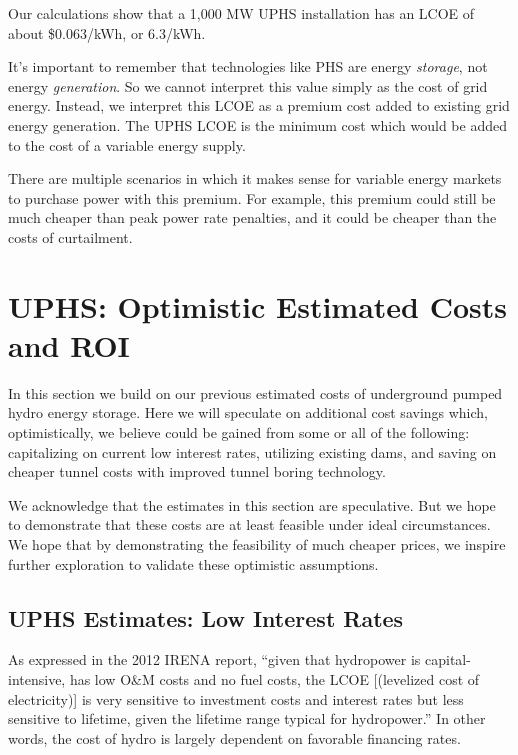 \documentclass[hidelinks,12pt,a4paper]{article}
\begin{document}
\begin{displayquote}
Our calculations show that a 1,000 MW UPHS installation has an LCOE of about \$0.063/kWh, or 6.3\cent/kWh.
\end{displayquote}

It's important to remember that technologies like PHS are energy \textit{storage}, not energy \textit{generation}. So we cannot interpret this value simply as the cost of grid energy. Instead, we interpret this LCOE as a premium cost added to existing grid energy generation. The UPHS LCOE is the minimum cost which would be added to the cost of a variable energy supply.

There are multiple scenarios in which it makes sense for variable energy markets to purchase power with this premium. For example, this premium could still be much cheaper than peak power rate penalties, and it could be cheaper than the costs of curtailment.


\pagebreak[4]
\section{UPHS: Optimistic Estimated Costs and ROI}
In this section we build on our previous estimated costs of underground pumped hydro energy storage. Here we will speculate on additional cost savings which, optimistically, we believe could be gained from some or all of the following: capitalizing on current low interest rates, utilizing existing dams, and saving on cheaper tunnel costs with improved tunnel boring technology.

We acknowledge that the estimates in this section are speculative. But we hope to demonstrate that these costs are at least feasible under ideal circumstances. We hope that by demonstrating the feasibility of much cheaper prices, we inspire further exploration to validate these optimistic assumptions.

\subsection{UPHS Estimates: Low Interest Rates}
As expressed in the 2012 IRENA report, “given that hydropower is capital-intensive, has low O\&M costs and no fuel costs, the LCOE [(levelized cost of electricity)] is very sensitive to investment costs and interest rates but less sensitive to lifetime, given the lifetime range typical for hydropower.” \cite{RenewableEnergyTechnologiesCostAnalysisSeries} In other words, the cost of hydro is largely dependent on favorable financing rates.
\end{document}
